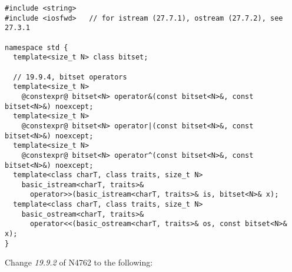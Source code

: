 \documentclass[ebook,11pt,article,a4paper]{memoir}
\begin{document}
\begin{lstlisting}[style=cppdiff]
#include <string>
#include <iosfwd>   // for istream (27.7.1), ostream (27.7.2), see 27.3.1

namespace std {
  template<size_t N> class bitset;

  // 19.9.4, bitset operators
  template<size_t N>
    @constexpr@ bitset<N> operator&(const bitset<N>&, const bitset<N>&) noexcept;
  template<size_t N>
    @constexpr@ bitset<N> operator|(const bitset<N>&, const bitset<N>&) noexcept;
  template<size_t N>
    @constexpr@ bitset<N> operator^(const bitset<N>&, const bitset<N>&) noexcept;
  template<class charT, class traits, size_t N>
    basic_istream<charT, traits>&
      operator>>(basic_istream<charT, traits>& is, bitset<N>& x);
  template<class charT, class traits, size_t N>
    basic_ostream<charT, traits>&
      operator<<(basic_ostream<charT, traits>& os, const bitset<N>& x);
}
\end{lstlisting}

Change \textit{19.9.2} of N4762 to the following:
\end{document}
